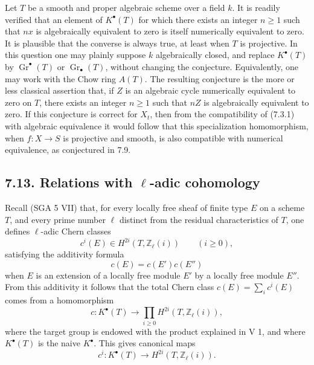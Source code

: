 \documentclass[11pt]{article}
\newcommand{\Gr}{\operatorname{Gr}}
\providecommand{\Gr}{\operatorname{Gr}}
\providecommand{\Gr}{\operatorname{G}}
\begin{document}
Let \(T\) be a smooth and proper algebraic scheme over a field \(k\). It is readily verified that an element of \(K^\bullet(T)\) for which there exists an integer \(n\geq1\) such that \(nx\) is algebraically equivalent to zero is itself numerically equivalent to zero. It is plausible that the converse is always true, at least when \(T\) is projective. In this question one may plainly suppose \(k\) algebraically closed, and replace \(K^\bullet(T)\) by \(\Gr^\bullet(T)\) or \(\Gr_\bullet(T)\), without changing the conjecture. Equivalently, one may work with the Chow ring \(A(T)\). The resulting conjecture is the more or less classical assertion that, if \(Z\) is an algebraic cycle numerically equivalent to zero on \(T\), there exists an integer \(n\geq1\) such that \(nZ\) is algebraically equivalent to zero. If this conjecture is correct for \(X_t\), then from the compatibility of (7.3.1) with algebraic equivalence it would follow that this specialization homomorphism, when \(f:X\to S\) is projective and smooth, is also compatible with numerical equivalence, as conjectured in 7.9.

\subsection*{7.13. Relations with \(\ell\)-adic cohomology}
Recall (SGA 5 VII) that, for every locally free sheaf of finite type \(E\) on a scheme \(T\), and every prime number \(\ell\) distinct from the residual characteristics of \(T\), one defines \(\ell\)-adic Chern classes
\[
  c^i(E)\in H^{2i}(T,\mathbb Z_\ell(i))\qquad (i\geq0),
\]
satisfying the additivity formula
\[
  c(E)=c(E')c(E'')
\]
when \(E\) is an extension of a locally free module \(E'\) by a locally free module \(E''\). From this additivity it follows that the total Chern class \(c(E)=\sum_i c^i(E)\) comes from a homomorphism
\begin{equation}\tag{7.13.0}
  c:K^\bullet(T)\longrightarrow
  \prod_{i\geq0}H^{2i}(T,\mathbb Z_\ell(i)),
\end{equation}
where the target group is endowed with the product explained in V 1, and where \(K^\bullet(T)\) is the naive \(K^\bullet\). This gives canonical maps
\begin{equation}\tag{7.13.1}
  c^i:K^\bullet(T)\longrightarrow H^{2i}(T,\mathbb Z_\ell(i)).
\end{equation}
\end{document}
